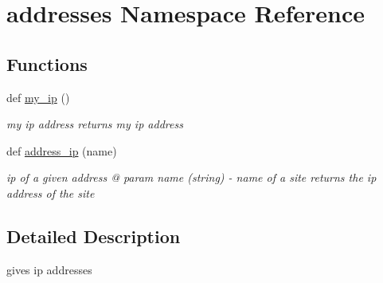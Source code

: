 \hypertarget{namespaceaddresses}{}\section{addresses Namespace Reference}
\label{namespaceaddresses}
\subsection*{Functions}
\begin{DoxyCompactItemize}
\item 
\mbox{\label{namespaceaddresses_a4978ce59b7db89c29d950794ff033499}} 
def \hyperlink{namespaceaddresses_a4978ce59b7db89c29d950794ff033499}{my\+\_\+ip} ()
\begin{DoxyCompactList}\small\item\em my ip address returns my ip address \end{DoxyCompactList}\item 
\mbox{\label{namespaceaddresses_a59dd4ba1fcefddc5b667aef82f479b7e}} 
def \hyperlink{namespaceaddresses_a59dd4ba1fcefddc5b667aef82f479b7e}{address\+\_\+ip} (name)
\begin{DoxyCompactList}\small\item\em ip of a given address @ param name (string) -\/ name of a site returns the ip address of the site \end{DoxyCompactList}\end{DoxyCompactItemize}


\subsection{Detailed Description}
\begin{DoxyVerb}gives ip addresses \end{DoxyVerb}
 